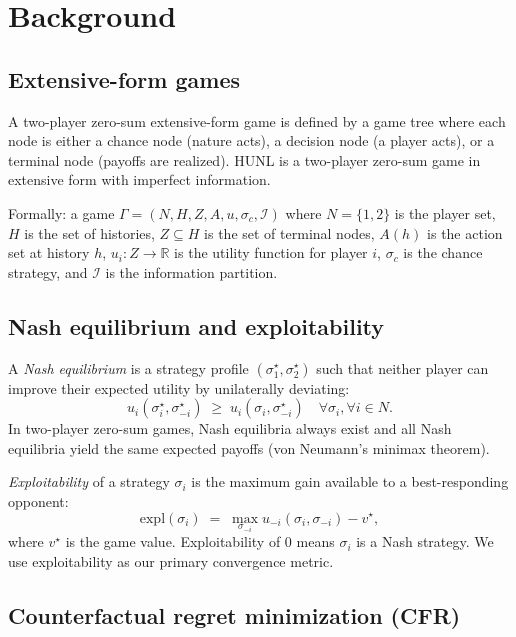 \section{Background}
\label{sec:background}

\subsection{Extensive-form games}

A two-player zero-sum extensive-form game is defined by a game tree where
each node is either a chance node (nature acts), a decision node (a player
acts), or a terminal node (payoffs are realized). HUNL is a two-player
zero-sum game in extensive form with imperfect information.

Formally: a game
$\Gamma = (N, H, Z, A, u, \sigma_c, \mathcal{I})$ where $N = \{1, 2\}$ is the
player set, $H$ is the set of histories, $Z \subseteq H$ is the set of
terminal nodes, $A(h)$ is the action set at history $h$,
$u_i\colon Z \to \mathbb{R}$ is the utility function for player $i$,
$\sigma_c$ is the chance strategy, and $\mathcal{I}$ is the information
partition.

\subsection{Nash equilibrium and exploitability}

A \emph{Nash equilibrium} is a strategy profile
$(\sigma_1^\star, \sigma_2^\star)$ such that neither player can improve their
expected utility by unilaterally deviating:
\[
  u_i(\sigma_i^\star, \sigma_{-i}^\star)
    \;\geq\; u_i(\sigma_i, \sigma_{-i}^\star)
    \quad \forall \sigma_i, \forall i \in N.
\]
In two-player zero-sum games, Nash equilibria always exist and all Nash
equilibria yield the same expected payoffs (von Neumann's minimax theorem).

\emph{Exploitability} of a strategy $\sigma_i$ is the maximum gain available
to a best-responding opponent:
\[
  \mathrm{expl}(\sigma_i)
    \;=\; \max_{\sigma_{-i}} u_{-i}(\sigma_i, \sigma_{-i}) - v^\star,
\]
where $v^\star$ is the game value. Exploitability of $0$ means $\sigma_i$ is
a Nash strategy. We use exploitability as our primary convergence metric.

\subsection{Counterfactual regret minimization (CFR)}

